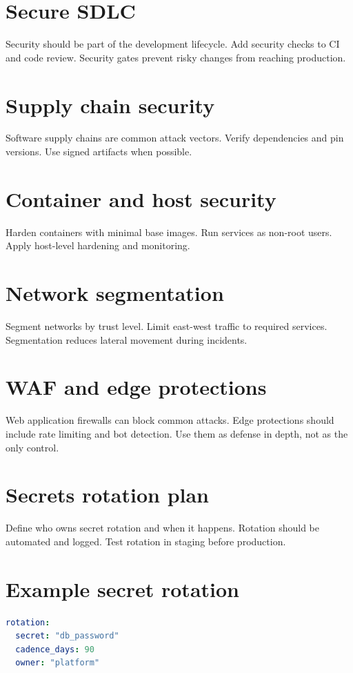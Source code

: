 \section{Secure SDLC}
Security should be part of the development lifecycle.
Add security checks to CI and code review.
Security gates prevent risky changes from reaching production.

\section{Supply chain security}
Software supply chains are common attack vectors.
Verify dependencies and pin versions.
Use signed artifacts when possible.

\section{Container and host security}
Harden containers with minimal base images.
Run services as non-root users.
Apply host-level hardening and monitoring.

\section{Network segmentation}
Segment networks by trust level.
Limit east-west traffic to required services.
Segmentation reduces lateral movement during incidents.

\section{WAF and edge protections}
Web application firewalls can block common attacks.
Edge protections should include rate limiting and bot detection.
Use them as defense in depth, not as the only control.

\section{Secrets rotation plan}
Define who owns secret rotation and when it happens.
Rotation should be automated and logged.
Test rotation in staging before production.

\section{Example secret rotation}
\begin{lstlisting}[language=YAML]
rotation:
  secret: "db_password"
  cadence_days: 90
  owner: "platform"
\end{lstlisting}

